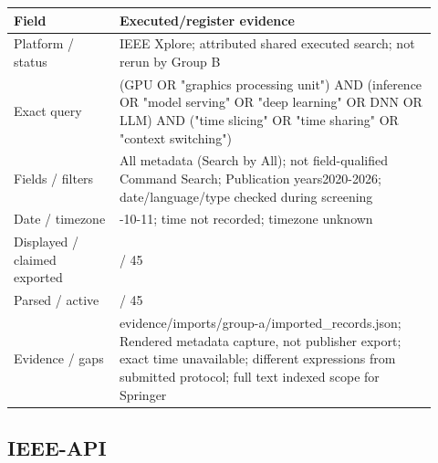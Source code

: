 \documentclass[12pt,a4paper]{article}
\begin{document}
{\small\begin{longtable}{>{\raggedright\arraybackslash}p{0.23\linewidth}>{\raggedright\arraybackslash}p{0.69\linewidth}}
\toprule
Field & Executed/\allowbreak{}register evidence\\\midrule
\endhead
Platform /\allowbreak{} status & IEEE Xplore; attributed shared executed search; not rerun by Group B\\
Exact query & (GPU OR "graphics processing unit") AND (inference OR "model serving" OR "deep learning" OR DNN OR LLM) AND ("time slicing" OR "time sharing" OR "context switching")\\
Fields /\allowbreak{} filters & All metadata (Search by All); not field-qualified Command Search; Publication years2020-2026; date/\allowbreak{}language/\allowbreak{}type checked during screening\\
Date /\allowbreak{} timezone & 2026-10-11; time not recorded; timezone unknown\\
Displayed /\allowbreak{} claimed exported & 45 /\allowbreak{} 45\\
Parsed /\allowbreak{} active & 45 /\allowbreak{} 45\\
Evidence /\allowbreak{} gaps & evidence/\allowbreak{}imports/\allowbreak{}group-a/\allowbreak{}imported\_\allowbreak{}records.json; Rendered metadata capture, not publisher export; exact time unavailable; different expressions from submitted protocol; full text indexed scope for Springer\\
\bottomrule
\end{longtable}}

\subsection*{IEEE-API}
\end{document}
